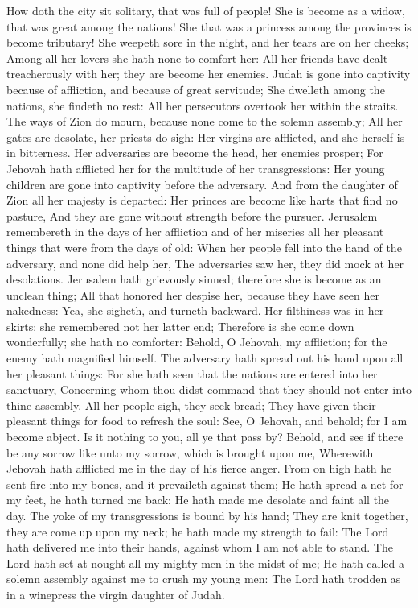 


How doth the city sit solitary, that was full of people! She is become as a widow, that was great among the nations! She that was a princess among the provinces is become tributary!  She weepeth sore in the night, and her tears are on her cheeks; Among all her lovers she hath none to comfort her: All her friends have dealt treacherously with her; they are become her enemies.  Judah is gone into captivity because of affliction, and because of great servitude; She dwelleth among the nations, she findeth no rest: All her persecutors overtook her within the straits.  The ways of Zion do mourn, because none come to the solemn assembly; All her gates are desolate, her priests do sigh: Her virgins are afflicted, and she herself is in bitterness.  Her adversaries are become the head, her enemies prosper; For Jehovah hath afflicted her for the multitude of her transgressions: Her young children are gone into captivity before the adversary.  And from the daughter of Zion all her majesty is departed: Her princes are become like harts that find no pasture, And they are gone without strength before the pursuer.  Jerusalem remembereth in the days of her affliction and of her miseries all her pleasant things that were from the days of old: When her people fell into the hand of the adversary, and none did help her, The adversaries saw her, they did mock at her desolations.  Jerusalem hath grievously sinned; therefore she is become as an unclean thing; All that honored her despise her, because they have seen her nakedness: Yea, she sigheth, and turneth backward.  Her filthiness was in her skirts; she remembered not her latter end; Therefore is she come down wonderfully; she hath no comforter: Behold, O Jehovah, my affliction; for the enemy hath magnified himself.  The adversary hath spread out his hand upon all her pleasant things: For she hath seen that the nations are entered into her sanctuary, Concerning whom thou didst command that they should not enter into thine assembly.  All her people sigh, they seek bread; They have given their pleasant things for food to refresh the soul: See, O Jehovah, and behold; for I am become abject.  Is it nothing to you, all ye that pass by? Behold, and see if there be any sorrow like unto my sorrow, which is brought upon me, Wherewith Jehovah hath afflicted me in the day of his fierce anger.  From on high hath he sent fire into my bones, and it prevaileth against them; He hath spread a net for my feet, he hath turned me back: He hath made me desolate and faint all the day.  The yoke of my transgressions is bound by his hand; They are knit together, they are come up upon my neck; he hath made my strength to fail: The Lord hath delivered me into their hands, against whom I am not able to stand.  The Lord hath set at nought all my mighty men in the midst of me; He hath called a solemn assembly against me to crush my young men: The Lord hath trodden as in a winepress the virgin daughter of Judah.  